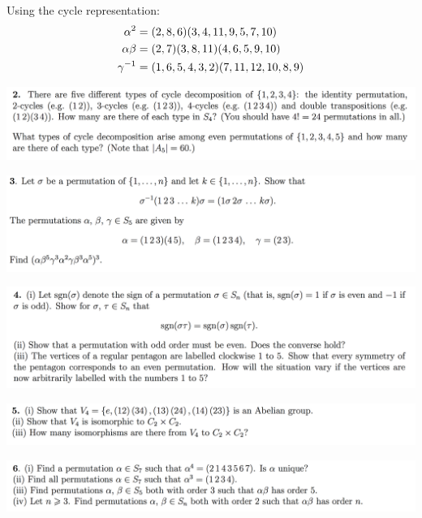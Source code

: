 \documentclass[12pt]{article}
\begin{document}
Using the cycle representation:
\begin{align*}
  \alpha^2    &= (2,8,6)(3,4,11,9,5,7,10)\\
  \alpha\beta &= (2,7)(3,8,11)(4,6,5,9,10)\\
  \gamma^{-1}   &= (1,6,5,4,3,2)(7,11,12,10,8,9)\\
\end{align*}

\newpage
\begin{mdframed}
\includegraphics[width=400pt]{img/oxford-prelims-M1-groups-2-2.png}
\end{mdframed}

\begin{mdframed}
\includegraphics[width=400pt]{img/oxford-prelims-M1-groups-2-3.png}
\end{mdframed}

\begin{mdframed}
\includegraphics[width=400pt]{img/oxford-prelims-M1-groups-2-4.png}
\end{mdframed}

\begin{mdframed}
\includegraphics[width=400pt]{img/oxford-prelims-M1-groups-2-5.png}
\end{mdframed}

\begin{mdframed}
\includegraphics[width=400pt]{img/oxford-prelims-M1-groups-2-6.png}
\end{mdframed}
\end{document}
